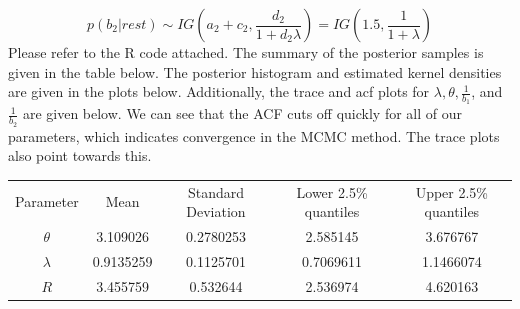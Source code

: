 \documentclass[10pt,a4paper]{article}
\begin{document}
$$p(b_2|rest) \sim IG(a_2+c_2,\frac{d_2}{1+d_2\lambda})=IG(1.5,\frac{1}{1+\lambda})$$
Please refer to the R code attached. The summary of the posterior samples is given in the table below. The posterior histogram and estimated kernel densities are given in the plots below. Additionally, the trace and acf plots for $\lambda, \theta, \frac{1}{b_1}$, and $\frac{1}{b_2}$ are given below. We can see that the ACF cuts off quickly for all of our parameters, which indicates convergence in the MCMC method. The trace plots also point towards this. 
\begin{center}
  \begin{tabular}{ |c|c|c|c|c| }
  \hline
  Parameter & Mean & Standard Deviation & Lower 2.5\% quantiles & Upper 2.5\% quantiles  \\ 
  $\theta$ & 3.109026 & 0.2780253 & 2.585145 & 3.676767 \\ 
  $\lambda$ & 0.9135259 & 0.1125701 & 0.7069611 & 1.1466074 \\
  $R$ & 3.455759 & 0.532644 & 2.536974 & 4.620163 \\
  \hline
  \end{tabular}
  \end{center}
  
\end{document}

